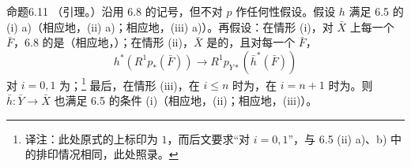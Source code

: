 \begin{SGAresult}{命题}{6.11}
（引理。）沿用 6.8 的记号，但不对 $p$ 作任何性假设。假设 $h$ 满足 6.5 的 (i) a)（相应地，(ii) a)；相应地，(iii) a)）。再假设：在情形 (i)，对 $\bar X$ 上每一个 $\bar F$，6.8 的是（相应地，）；在情形 (ii)，$\bar X$ 是的，且对每一个 $\bar F$，
\[
h^*(R^1p_*(\bar F))\longrightarrow R^1p_{Y*}(\bar h^*(\bar F))
\]
对 $i=0,1$ 为；\footnote{译注：此处原式的上标印为 $1$，而后文要求“对 $i=0,1$”，与 6.5 (ii) a)、b) 中的排印情况相同，此处照录。}
最后，在情形 (iii)，在 $i\leq n$ 时为，在 $i=n+1$ 时为。则 $\bar h:\bar Y\to\bar X$ 也满足 6.5 的条件 (i)（相应地，(ii)；相应地，(iii)）。
\end{SGAresult}


